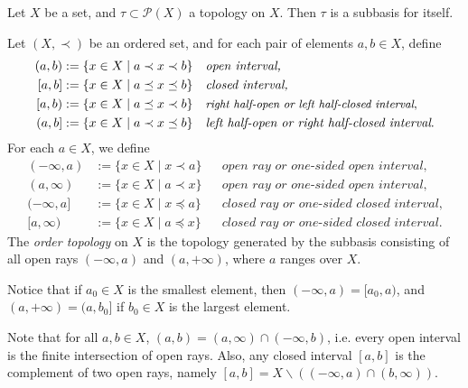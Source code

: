 \begin{exmp}
	Let $X$ be a set, and $\tau\subset \mathscr P(X)$ a topology on $X$. Then $\tau$ is a subbasis for itself.
\end{exmp}

\begin{defn}\label{defn:order_topology}
	Let $(X, \prec)$ be an ordered set, and for each pair of elements $a, b\in X$, define
	\begin{align*}
		(a, b) &:= \{x\in X\mid a \prec x \prec b\} &&\textit{open interval,}
		\\ [a, b] &:= \{x\in X \mid a \preceq x \preceq b \} && \textit{closed interval,}
		\\ [a, b) &:= \{x\in X\mid a \preceq x\prec b \} && \small\textit{right half-open or left half-closed interval}\normalsize,
		\\ (a, b] &:= \{x\in X\mid a \prec x\preceq b \} && \textit{left half-open or right half-closed interval}.
	\end{align*}
	For each $a\in X$, we define
	\begin{align*}
		(-\infty, a) &:= \{x\in X \mid x \prec a\} && \textit{open ray or one-sided open interval,}
		\\ (a, \infty) &:= \{x\in X \mid a \prec x\} && \textit{open ray or one-sided open interval,}
		\\ (-\infty, a] &:= \{x\in X \mid x \preceq a\} && \textit{closed ray or one-sided closed interval,}
		\\ [a, \infty) &:= \{x\in X\mid a \preceq x \} && \textit{closed ray or one-sided closed interval.}
	\end{align*}
	The \textit{order topology} on $X$ is the topology generated by the subbasis consisting of all open rays $(-\infty, a)$ and $(a, +\infty)$, where $a$ ranges over $X$.
\end{defn}

\begin{remark}
	Notice that if $a_0\in X$ is the smallest element, then $(-\infty, a) = [a_0, a)$, and $ (a, +\infty) = (a, b_0]$ if $b_0\in X$ is the largest element.
\end{remark}

\begin{remark}\label{remark:open_intervals_union_open_rays}
	Note that for all $a, b\in X$, $(a, b) = (a, \infty) \cap (-\infty, b)$, i.e. every open interval is the finite intersection of open rays. Also, any closed interval $[a, b]$ is the complement of two open rays, namely $[a, b] = X \backslash \left((-\infty, a) \cap (b, \infty)\right)$.
\end{remark}

